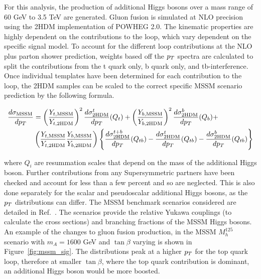 For this analysis, the production of additional Higgs bosons over a mass range of 60 GeV to 3.5 TeV are generated.
Gluon fusion is simulated at NLO precision using the 2HDM implementation of POWHEG 2.0.
The kinematic properties are highly dependent on the contributions to the loop, which vary dependent on the specific signal model.
To account for the different loop contributions at the NLO plus parton shower prediction, weights based off the $p_{T}$ spectra are calculated to split the contributions from the t quark only, b quark only, and tb-interference.
Once individual templates have been determined for each contribution to the loop, the 2HDM samples can be scaled to the correct specific MSSM scenario prediction by the following formula.

\begin{align}
\frac{d\sigma_{\text{MSSM}}}{dp_{T}} & = \left(\frac{Y_{t,\text{MSSM}}}{Y_{t,\text{2HDM}}}\right)^{2}\frac{d\sigma^{t}_{\text{2HDM}}}{dp_{T}}(Q_{t}) + \left(\frac{Y_{b,\text{MSSM}}}{Y_{b,\text{2HDM}}}\right)^{2}\frac{d\sigma^{b}_{\text{2HDM}}}{dp_{T}}(Q_{b}) + \nonumber \\
& \left(\frac{Y_{t,\text{MSSM}}}{Y_{t,\text{2HDM}}}\frac{Y_{b,\text{MSSM}}}{Y_{b,\text{2HDM}}}\right) \left\{ \frac{d\sigma^{t+b}_{\text{2HDM}}}{dp_{T}}(Q_{tb}) - \frac{d\sigma^{t}_{\text{2HDM}}}{dp_{T}}(Q_{tb}) - \frac{d\sigma^{b}_{\text{2HDM}}}{dp_{T}}(Q_{tb}) \right\}
\label{eqn:ggh_reweight}
\end{align}

where $Q_i$ are resummation scales that depend on the mass of the additional Higgs boson.
Further contributions from any Supersymmetric partners have been checked and account for less than a few percent and so are neglected.
This is also done separately for the scalar and pseudoscalar additional Higgs bosons, as the $p_{T}$ distributions can differ.
The MSSM benchmark scenarios considered are detailed in Ref.~\cite{}.
The scenarios provide the relative Yukawa couplings (to calculate the cross sections) and branching fractions of the MSSM Higgs bosons.
An example of the changes to gluon fusion production, in the MSSM $M_{h}^{125}$ scenario with $m_{A} = 1600$ GeV and $\tan\beta$ varying is shown in Figure~\ref{fig:mssm_sig}.
The distributions peak at a higher $p_{T}$ for the top quark loop, therefore at smaller $\tan\beta$, where the top quark contribution is dominant, an additional Higgs boson would be more boosted. \\

